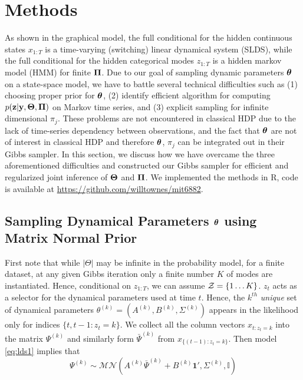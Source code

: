 \documentclass{article} %
\begin{document}
\section{Methods}

As shown in the graphical model, the full conditional for the hidden continuous states $x_{1:T}$ is a time-varying (switching) linear dynamical system (SLDS), while the full conditional for the hidden categorical modes $z_{1:T}$ is a hidden markov model (HMM) for finite $\boldsymbol{\Pi}$. Due to our goal of sampling dynamic parameters $\boldsymbol{\theta}$ on a state-space model, we have to battle several technical difficulties such as (1) choosing proper prior for $\boldsymbol{\theta}$, (2) identify efficient algorithm for computing $p({\bf z}|{\bf y}, \boldsymbol{\Theta}, \boldsymbol{\Pi})$ on Markov time series, and (3) explicit sampling for infinite dimensional $\pi_j$. These problems are not encountered in classical HDP \citep{teh_hierarchical_2006} due to the lack of time-series dependency between observations, and the fact that $\boldsymbol{\theta}$ are not of interest in classical HDP and therefore $\boldsymbol{\theta}$, $\pi_j$ can be integrated out in their Gibbs sampler. In this section, we discuss how we have overcame the three aforementioned difficulties and constructed our Gibbs sampler for efficient and regularized joint inference of $\boldsymbol{\Theta}$ and $\boldsymbol{\Pi}$. We implemented the methods in R, code is available at \url{https://github.com/willtownes/mit6882}.

\subsection{Sampling Dynamical Parameters $\boldsymbol{\theta}$ using Matrix Normal Prior}

First note that while $\vert\Theta\vert$ may be infinite in the probability model, for a finite dataset, at any given Gibbs iteration only a finite number $K$ of modes are instantiated. Hence, conditional on $z_{1:T}$, we can assume ${\cal Z}=\{1\ldots K\}$. $z_t$ acts as a selector for the dynamical parameters used at time $t$. Hence, the $k^{th}$ \textit{unique} set of dynamical parameters $\theta^{(k)} = (A^{(k)},B^{(k)},\Sigma^{(k)})$ appears in the likelihood only for indices $\{t,t-1: z_t=k\}$. We collect all the column vectors $x_{t:z_t=k}$ into the matrix $\Psi^{(k)}$ and similarly form $\bar{\Psi}^{(k)}$ from $x_{\{(t-1):z_t=k\}}$. Then model \eqref{eq:lds1} implies that
\[\Psi^{(k)}\sim\mathcal{MN}(A^{(k)}\bar{\Psi}^{(k)}+B^{(k)}\mathbf{1}',\Sigma^{(k)},\mathbb{I})\]
\end{document}

